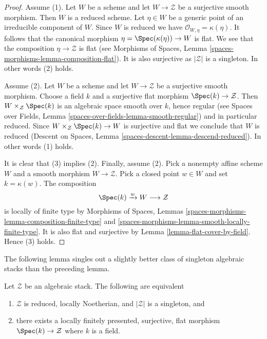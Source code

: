 \begin{proof}
Assume (1). Let $W$ be a scheme and
let $W \to \mathcal{Z}$ be a surjective smooth morphism. Then $W$ is
a reduced scheme. Let $\eta \in W$ be a generic point of an irreducible
component of $W$. Since $W$ is reduced we have
$\mathcal{O}_{W, \eta} = \kappa(\eta)$. It follows that the canonical
morphism $\eta = \Spec(\kappa(\eta)) \to W$ is flat. We see that the
composition $\eta \to \mathcal{Z}$ is flat (see
Morphisms of Spaces, Lemma \ref{spaces-morphisms-lemma-composition-flat}).
It is also surjective as $|\mathcal{Z}|$ is a singleton. In other words
(2) holds.

\medskip\noindent
Assume (2). Let $W$ be a scheme and
let $W \to \mathcal{Z}$ be a surjective smooth morphism. Choose a field
$k$ and a surjective flat morphism $\Spec(k) \to \mathcal{Z}$.
Then $W \times_\mathcal{Z} \Spec(k)$ is an algebraic space smooth
over $k$, hence regular (see
Spaces over Fields, Lemma \ref{spaces-over-fields-lemma-smooth-regular})
and in particular reduced. Since $W \times_\mathcal{Z} \Spec(k) \to W$
is surjective and flat we conclude that $W$ is reduced
(Descent on Spaces, Lemma \ref{spaces-descent-lemma-descend-reduced}).
In other words (1) holds.

\medskip\noindent
It is clear that (3) implies (2). Finally, assume (2). Pick a nonempty
affine scheme $W$ and a smooth morphism $W \to \mathcal{Z}$. Pick a closed
point $w \in W$ and set $k = \kappa(w)$. The composition
$$
\Spec(k) \xrightarrow{w} W \longrightarrow \mathcal{Z}
$$
is locally of finite type by
Morphisms of Spaces, Lemmas
\ref{spaces-morphisms-lemma-composition-finite-type} and
\ref{spaces-morphisms-lemma-smooth-locally-finite-type}.
It is also flat and surjective by
Lemma \ref{lemma-flat-cover-by-field}.
Hence (3) holds.
\end{proof}

\noindent
The following lemma singles out a slightly better class of singleton
algebraic stacks than the preceding lemma.

\begin{lemma}
\label{lemma-unique-point-better}
Let $\mathcal{Z}$ be an algebraic stack. The following are equivalent
\begin{enumerate}
\item $\mathcal{Z}$ is reduced, locally Noetherian, and $|\mathcal{Z}|$
is a singleton, and
\item there exists a locally finitely presented, surjective, flat morphism
$\Spec(k) \to \mathcal{Z}$ where $k$ is a field.
\end{enumerate}
\end{lemma}

